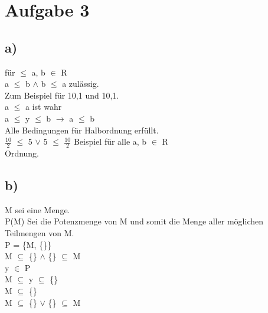 \documentclass{article}
\begin{document}
	\section*{Aufgabe 3}
	\subsection*{a)}
	für $\leq$
	a, b $\in$ R \\
	a $\leq$ b $\land$ b $\leq$ a zulässig. \\
	Zum Beispiel für 10,1 und 10,1. \\
	a $\leq$ a ist wahr \\
	a $\leq$ y $\leq$ b $\to$ a $\leq$ b \\
	Alle Bedingungen für Halbordnung erfüllt. \\
	$\frac{10}{2}$ $\leq$ 5 $\lor$ 5 $\leq$ $\frac{10}{2}$ Beispiel für alle a, b $\in$ R \\
	Ordnung.
	\subsection*{b)}
	M sei eine Menge. \\
	P(M) Sei die Potenzmenge von M und somit die Menge aller möglichen Teilmengen von M. \\
	P =  \{M, \{\}\} \\
	M $\subseteq$ \{\} $\land$ \{\} $\subseteq$ M \\
	y $\in$ P \\
	M $\subseteq$ y $\subseteq$ \{\} \\
	M $\subseteq$ \{\} \\
	M $\subseteq$ \{\} $\lor$ \{\} $\subseteq$ M \\
	
\end{document}
